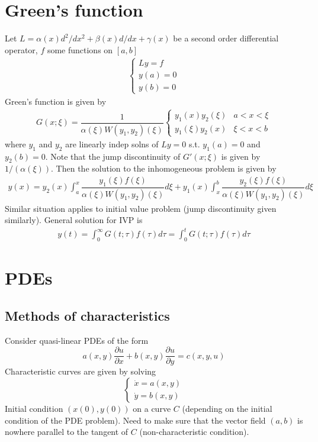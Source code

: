 \documentclass{article}
\theoremstyle{definition}
\theoremstyle{remark}
\theoremstyle{plain}
\theoremstyle{definition}
\begin{document}
\section{Green's function}
Let $L=\alpha(x) d^2/dx^2+\beta(x)d/dx+\gamma(x)$ be a second order differential operator, $f$ some functions on $[a,b]$
\begin{align*}
    \begin{cases}
        Ly=f\\
        y(a)=0\\
        y(b)=0
    \end{cases}
\end{align*}
Green's function is given by
\begin{align*}
    G(x;\xi)=\dfrac{1}{\alpha(\xi)W(y_1,y_2)(\xi)}\begin{cases}
        y_1(x)y_2(\xi) & a<x<\xi\\
        y_1(\xi)y_2(x) & \xi<x<b
    \end{cases}
\end{align*}
where $y_1$ and $y_2$ are linearly indep solns of $Ly=0$ s.t. $y_1(a)=0$ and $y_2(b)=0$. Note that the jump discontinuity of $G'(x;\xi)$ is given by $1/(\alpha(\xi))$.
Then the solution to the inhomogeneous problem is given by
\begin{align*}
    y(x)=y_2(x)\int_a^x\dfrac{y_1(\xi)f(\xi)}{\alpha(\xi)W(y_1,y_2)(\xi)}d\xi+ y_1(x)\int_x^b\dfrac{y_2(\xi)f(\xi)}{\alpha(\xi)W(y_1,y_2)(\xi)}d\xi
\end{align*}
Similar situation applies to initial value problem (jump discontinuity given similarly). General solution for IVP is
\begin{align*}
    y(t)=\int_0^\infty G(t;\tau)f(\tau)d\tau=\int_0^tG(t;\tau)f(\tau)d\tau
\end{align*}
\section{PDEs}
\subsection{Methods of characteristics}
Consider quasi-linear PDEs of the form
\[a(x,y)\dfrac{\partial u}{\partial x}+b(x,y)\dfrac{\partial u}{\partial y}=c(x,y,u)\]
Characteristic curves are given by solving
\[\begin{cases}
    \dot x=a(x,y)\\
    \dot y=b(x,y)
\end{cases}\]
Initial condition $(x(0),y(0))$ on a curve $C$ (depending on the initial condition of the PDE problem).
Need to make sure that the vector field $(a,b)$ is nowhere parallel to the tangent of $C$ (non-characteristic condition).
\end{document}
